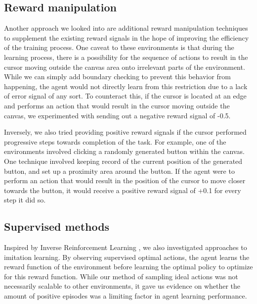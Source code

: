 \documentclass[10pt,journal,compsoc]{IEEEtran}
\begin{document}
\subsection{Reward manipulation}
Another approach we looked into are additional reward manipulation techniques to supplement the existing reward signals in the hope of improving the efficiency of the training process. One caveat to these environments is that during the learning process, there is a possibility for the sequence of actions to result in the cursor moving outside the canvas area onto irrelevant parts of the environment. While we can simply add boundary checking to prevent this behavior from happening, the agent would not directly learn from this restriction due to a lack of error signal of any sort. To counteract this, if the cursor is located at an edge and performs an action that would result in the cursor moving outside the canvas, we experimented with sending out a negative reward signal of -0.5. \linebreak

Inversely, we also tried providing positive reward signals if the cursor performed progressive steps towards completion of the task. For example, one of the environments involved clicking a randomly generated button within the canvas. One technique involved keeping record of the current position of the generated button, and set up a proximity area around the button. If the agent were to perform an action that would result in the position of the cursor to move closer towards the button, it would receive a positive reward signal of +0.1 for every step it did so. \linebreak

\subsection{Supervised methods}
Inspired by Inverse Reinforcement Learning \cite{abbeel2004apprenticeship}, we also investigated approaches to imitation learning. By observing supervised optimal actions, the agent learns the reward function of the environment before learning the optimal policy to optimize for this reward function. While our method of sampling ideal actions was not necessarily scalable to other environments, it gave us evidence on whether the amount of positive episodes was a limiting factor in agent learning performance.
\end{document}
